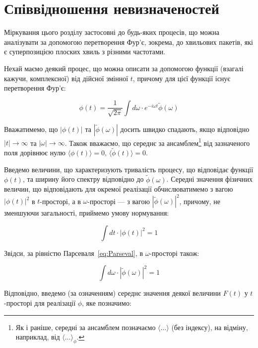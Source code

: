 \section{Співвідношення невизначеностей}\label{sec:uncert_principle}

Міркування цього розділу застосовні до будь-яких процесів, що можна аналізувати за допомогою перетворення Фур’є, зокрема, до хвильових пакетів, які є
суперпозицією плоских хвиль з різними частотами.

Нехай маємо деякий процес, що можна описати за допомогою функції (взагалі кажучи, комплексної) від дійсної змінної \( t \), причому для цієї функції існує перетворення Фур’є:

\begin{equation*}
    \phi(t) = \frac{1}{\sqrt{2\pi}} \int d\omega \cdot e^{-i\omega t} \tilde\phi(\omega)
\end{equation*}

Вважатимемо, що \( |\phi(t)| \) та \( |\tilde\phi(\omega)| \) досить швидко спадають, якщо відповідно \( |t| \to \infty \) та \( |\omega| \to \infty \). Також вважаємо, що середнє за ансамблем\footnote{Як і раніше, середні за ансамблем позначаємо $\langle\ldots\rangle$ (без індексу), на відміну, наприклад, від $\langle\ldots\rangle_{\phi}$. } від зазначеного поля дорівнює нулю $\langle \phi(t) \rangle = 0 $,  $\langle \tilde\phi(t) \rangle = 0 $.

Введемо величини, що характеризують тривалість процесу, що відповідає функції \( \phi(t) \), та ширину його спектру відповідно до \( \tilde\phi(\omega) \).
Середні значення фізичних величин, що відповідають для окремої реалізації обчислюватимемо з вагою \( |\phi(t)|^2 \) в $t$-просторі, а в \( \omega \)-просторі --- з вагою \( |\tilde\phi(\omega)|^2 \), причому, не
зменшуючи загальності, приймемо умову нормування:

\begin{equation*}
    \int dt \cdot |\phi(t)|^2 = 1
\end{equation*}

Звідси, за рівністю Парсеваля~\eqref{eq:Parseval}, в \( \omega \)-просторі також:

\begin{equation*}
    \int d\omega \cdot |\tilde\phi(\omega)|^2 = 1
\end{equation*}

Відповідно, введемо (за означенням) середнє значення деякої величини \( F(t) \) у \( t \)-просторі для реалізації $\phi$, яке позначимо:

